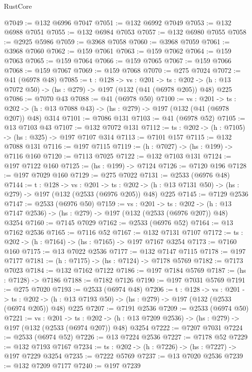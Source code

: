 \begin{lexlean}{RustCore}
\begin{coremodule}
@7049 := @132 @6996 @7047
@7051 := @132 @6992 @7049
@7053 := @132 @6988 @7051
@7055 := @132 @6984 @7053
@7057 := @132 @6980 @7055
@7058 := @2925 @5986
@7059 := @3968 @7058
@7060 := @3968 @7059
@7061 := @3968 @7060
@7062 := @159 @7061
@7063 := @159 @7062
@7064 := @159 @7063
@7065 := @159 @7064
@7066 := @159 @7065
@7067 := @159 @7066
@7068 := @159 @7067
@7069 := @159 @7068
@7070 := @275 @7024
@7072 := @41 (@6978 @48)
@7085 := {t : @128} ->
  {vs : @201} ->
  {ts : @202} -> (h : @13 @7072 @50) -> (hs : @279) -> @197 (@132 (@41 (@6978 @205)) @48) @225
@7086 := @7070 @43
@7088 := @41 (@6978 @50)
@7100 := {vs : @201} ->
  {ts : @202} -> (h : @13 @7088 @43) -> (hs : @279) -> @197 (@132 (@41 (@6978 @207)) @48) @314
@7101 := @7086 @131
@7103 := @41 (@6978 @52)
@7105 := @13 @7103 @43
@7107 := @132 @7072 @131
@7112 := {ts : @202} -> (h : @7105) -> (hs : @325) -> @197 @7107 @314
@7113 := @7101 @157
@7115 := @132 @7088 @131
@7116 := @197 @7115
@7119 := (h : @7027) -> (hs : @199) -> @7116 @160
@7120 := @7113 @7025
@7122 := @132 @7103 @131
@7124 := @197 @7122 @160
@7125 := (hs : @199) -> @7124
@7126 := @7120 @196
@7128 := @197 @7029 @160
@7129 := @275 @7022
@7131 := @2533 (@6976 @48)
@7144 := {t : @128} ->
  {vs : @201} ->
  {ts : @202} -> (h : @13 @7131 @50) -> (hs : @279) -> @197 (@132 (@2533 (@6976 @205)) @48) @225
@7145 := @7129 @2536
@7147 := @2533 (@6976 @50)
@7159 := {vs : @201} ->
  {ts : @202} -> (h : @13 @7147 @2536) -> (hs : @279) -> @197 (@132 (@2533 (@6976 @207)) @48) @3254
@7160 := @7145 @7029
@7162 := @2533 (@6976 @52)
@7164 := @13 @7162 @2536
@7165 := @7116 @52
@7167 := @132 @7131 @7107
@7172 := {ts : @202} -> (h : @7164) -> (hs : @7165) -> @197 @7167 @3254
@7173 := @7160 @160
@7175 := @13 @7022 @2536
@7177 := @132 @7147 @7115
@7178 := @197 @7177
@7181 := (h : @7175) -> (hs : @7124) -> @7178 @5769
@7182 := @7173 @7023
@7184 := @132 @7162 @7122
@7186 := @197 @7184 @5769
@7187 := (hs : @7128) -> @7186
@7188 := @7182 @7126
@7190 := @197 @7031 @5769
@7191 := @275 @7020
@7193 := @2533 (@6974 @48)
@7206 := {t : @128} ->
  {vs : @201} ->
  {ts : @202} -> (h : @13 @7193 @50) -> (hs : @279) -> @197 (@132 (@2533 (@6974 @205)) @48) @225
@7207 := @7191 @2536
@7209 := @2533 (@6974 @50)
@7221 := {vs : @201} ->
  {ts : @202} -> (h : @13 @7209 @2536) -> (hs : @279) -> @197 (@132 (@2533 (@6974 @207)) @48) @3254
@7222 := @7207 @7031
@7224 := @2533 (@6974 @52)
@7226 := @13 @7224 @2536
@7227 := @7178 @52
@7229 := @132 @7193 @7167
@7234 := {ts : @202} -> (h : @7226) -> (hs : @7227) -> @197 @7229 @3254
@7235 := @7222 @5769
@7237 := @13 @7020 @2536
@7239 := @132 @7209 @7177
@7240 := @197 @7239

\end{coremodule}
\end{lexlean}
